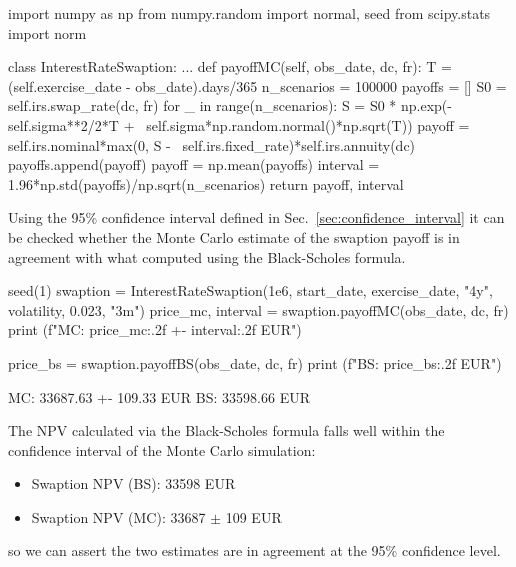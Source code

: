 \begin{ipython}
import numpy as np
from numpy.random import normal, seed
from scipy.stats import norm 

class InterestRateSwaption:
    ...
    def payoffMC(self, obs_date, dc, fr):
        T = (self.exercise_date - obs_date).days/365
        n_scenarios = 100000
        payoffs = []
        S0 = self.irs.swap_rate(dc, fr)
        for _ in range(n_scenarios):
            S = S0 * np.exp(-self.sigma**2/2*T + \
                            self.sigma*np.random.normal()*np.sqrt(T))
            payoff = self.irs.nominal*max(0, S - \
                                          self.irs.fixed_rate)*self.irs.annuity(dc)
            payoffs.append(payoff)
        payoff = np.mean(payoffs)
        interval = 1.96*np.std(payoffs)/np.sqrt(n_scenarios)
        return payoff, interval
\end{ipython}

Using the 95\% confidence interval defined in Sec.~\ref{sec:confidence_interval} it can be checked whether the Monte Carlo estimate of the swaption payoff is in agreement with what computed using the Black-Scholes formula.

\begin{ipython}
seed(1)
swaption = InterestRateSwaption(1e6, start_date, exercise_date, "4y",
                                volatility, 0.023, "3m")
price_mc, interval = swaption.payoffMC(obs_date, dc, fr)
print (f"MC: {price_mc:.2f} +- {interval:.2f} EUR")

price_bs = swaption.payoffBS(obs_date, dc, fr)
print (f"BS: {price_bs:.2f} EUR")
\end{ipython}
\begin{ioutput}
MC: 33687.63 +- 109.33 EUR
BS: 33598.66 EUR
\end{ioutput}

The NPV calculated via the Black-Scholes formula falls well within the confidence interval of the Monte Carlo simulation:

\begin{itemize}
\tightlist
\item Swaption NPV (BS): 33598 EUR
\item Swaption NPV (MC): 33687 $\pm$ 109 EUR
\end{itemize}
so we can assert the two estimates are in agreement at the 95\% confidence level.

%

